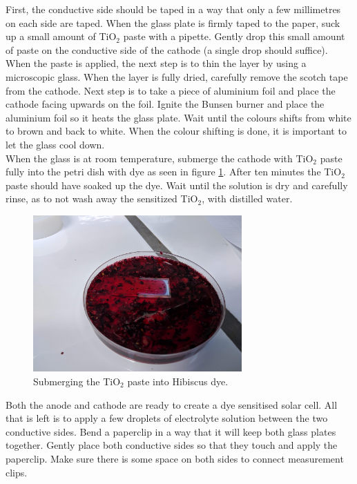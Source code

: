 \documentclass[conference]{IEEEtran}
\begin{document}
First, the conductive side should be taped in a way that only a few millimetres on each side are taped. When the glass plate is firmly taped to the paper, suck up a small amount of TiO$_2$ paste with a pipette. Gently drop this small amount of paste on the conductive side of the cathode (a single drop should suffice). When the paste is applied, the next step is to thin the layer by using a microscopic glass. When the layer is fully dried, carefully remove the scotch tape from the cathode. Next step is to take a piece of aluminium foil and place the cathode facing upwards on the foil. Ignite the Bunsen burner and place the aluminium foil so it heats the glass plate. Wait until the colours shifts from white to brown and back to white. When the colour shifting is done, it is important to let the glass cool down.\\

When the glass is at room temperature, submerge the cathode with TiO$_2$ paste fully into the petri dish with dye as seen in figure \ref{fig:submergingTiOHib}. After ten minutes the TiO$_2$ paste should have soaked up the dye. Wait until the solution is dry and carefully rinse, as to not wash away the sensitized TiO$_2$, with distilled water.\\


\begin{figure}[H]
\centering
\includegraphics[width=8.0cm]{5SubmergingTiOHib.jpg}
\caption{Submerging the TiO$_2$ paste into Hibiscus dye.}
\label{fig:submergingTiOHib} %
\end{figure}

Both the anode and cathode are ready to create a dye sensitised solar cell. All that is left is to apply a few droplets of electrolyte solution between the two conductive sides. Bend a paperclip in a way that it will keep both glass plates together. Gently place both conductive sides so that they touch and apply the paperclip. Make sure there is some space on both sides to connect measurement clips.\\
\end{document}
